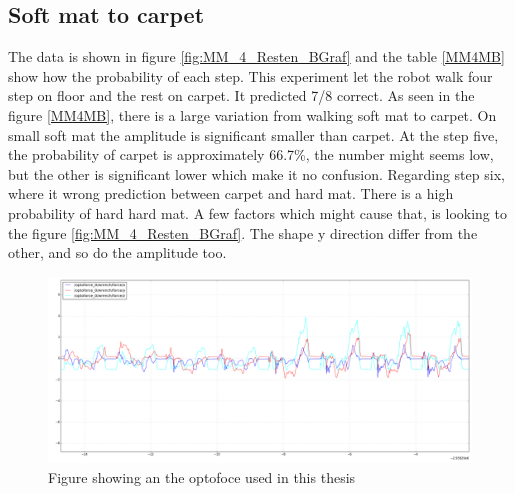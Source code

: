 \documentclass[USenglish]{ifimaster}  %
\begin{document}
\begin{table}[h]
\centering
{}
\caption{MM 4Resten MBNY}
\label{MM4MB}
\end{table}
\FloatBarrier
\subsection{Soft mat to carpet}
The data is shown in figure \ref{fig:MM_4_Resten_BGraf} and the table \ref{MM4MB} show how the probability of each step. This experiment let the robot walk four step on floor and the rest on carpet. It predicted 7/8 correct. As seen in the figure \ref{MM4MB}, there is a large variation from walking soft mat to carpet. On small soft mat the amplitude is significant smaller than carpet. At the step five, the probability of carpet is approximately 66.7\%, the number might seems low, but the other is significant lower which make it no confusion. Regarding step six, where it wrong prediction between carpet and hard mat. There is a high probability of hard hard mat. A few factors which might cause that, is looking to the figure \ref{fig:MM_4_Resten_BGraf}. The shape y direction differ from the other, and so do the amplitude too.


\begin{figure}[h]
    \centering
    \includegraphics[width=\textwidth,height=\textheight,keepaspectratio]{Figures/MM4Teppe2}
    \caption{Figure showing an the optofoce used in this thesis \cite{OptoforceFig}}
    \label{fig:optoforce}
\end{figure}
\end{document}
